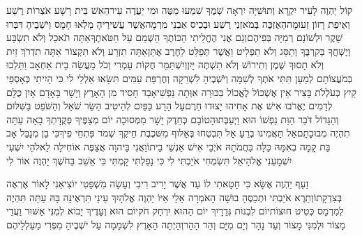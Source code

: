 \documentclass[../main/main.tex]{subfiles}
\begin{document}
\begin{multicols}{\ncols}
קוֹל יַהְוֶה לָעִיר יִקְרָא וְתוּשִׁיָּה יִרְאָה\SubEnd{} שְׁמֶךָ שִׁמְעוּ מַטֶּה וּמִי יַעֲדֶה עִיר\SubEnd{}\PreVerseSpace{}הַאִשׁ בֵּית רָשָׁע אֹצְרוֹת רֶשַׁע וְאֵיפַת רָזוֹן זְעוּמָה\PreVerseSpace{}הַאֶזְכֶּה בְּמֹאזְנֵי רֶשַׁע וּבְכִיס אַבְנֵי מִרְמָה\PreVerseSpace{}אֲשֶׁר עֲשִׁירֶיהָ מָלְאוּ חָמָס וְיֹשְׁבֶיהָ דִּבְּרוּ שָׁקֶר וּלְשׁוֹנָם רְמִיָּה בְּפִיהֶם\PreVerseSpace{}וְגַם אֲנִי הֶחֱלֵיתִי הַכּוֹתֶךָ הַשְׁמֵם עַל חַטֹּאתֶךָ\PreVerseSpace{}אַתָּה תֹאכַל וְלֹא תִשְׂבָּע וְיֶשְׁחֲךָ בְּקִרְבֶּךָ וְתַסֵּג וְלֹא תַפְלִיט וַאֲשֶׁר תְּפַלֵּט לַחֶרֶב אֶתֵּן\PreVerseSpace{}אַתָּה תִזְרַע וְלֹא תִקְצוֹר אַתָּה תִדְרֹךְ זַיִת וְלֹא תָסוּךְ שֶׁמֶן וְתִירוֹשׁ וְלֹא תִשְׁתֶּה יָּיִן\PreVerseSpace{}וְיִשְׁתַּמֵּר חֻקּוֹת עָמְרִי וְכֹל מַעֲשֵׂה בֵית אַחְאָב וַתֵּלְכוּ בְּמֹעֲצוֹתָם לְמַעַן תִּתִּי אֹתְךָ לְשַׁמָּה וְיֹשְׁבֶיהָ לִשְׁרֵקָה וְחֶרְפַּת עַמִּים\SubEnd{} תִּשָּׂאוּ \ClosedSection{}אַלְלַי לִי כִּי הָיִיתִי כְּאָסְפֵּי קַיִץ כְּעֹלְלֹת בָּצִיר אֵין אֶשְׁכּוֹל לֶאֱכוֹל בִּכּוּרָה אִוְּתָה נַפְשִׁי\PreVerseSpace{}אָבַד חָסִיד מִן הָאָרֶץ וְיָשָׁר בָּאָדָם אָיִן כֻּלָּם לְדָמִים יֶאֱרֹבוּ אִישׁ אֶת אָחִיהוּ יָצוּדוּ חֵרֶם\PreVerseSpace{}עַל הָרַע כַּפַּיִם לְהֵיטִיב הַשַּׂר שֹׁאֵל וְהַשֹּׁפֵט בַּשִּׁלּוּם וְהַגָּדוֹל דֹּבֵר הַוַּת נַפְשׁוֹ הוּא וַיְעַבְּתוּהָ\PreVerseSpace{}טוֹבָם כְּחֵדֶק יָשָׁר מִמְּסוּכָה יוֹם מְצַפֶּיךָ פְּקֻדָּתְךָ בָאָה עַתָּה תִהְיֶה מְבוּכָתָם\PreVerseSpace{}אַל תַּאֲמִינוּ בְרֵעַ אַל תִּבְטְחוּ בְּאַלּוּף מִשֹּׁכֶבֶת חֵיקֶךָ שְׁמֹר פִּתְחֵי פִיךָ\PreVerseSpace{}כִּי בֵן מְנַבֵּל אָב בַּת קָמָה בְאִמָּהּ כַּלָּה בַּחֲמֹתָהּ אֹיְבֵי אִישׁ אַנְשֵׁי בֵיתוֹ\PreVerseSpace{}וַאֲנִי בַּיהוָה אֲצַפֶּה אוֹחִילָה לֵאלֹהֵי יִשְׁעִי יִשְׁמָעֵנִי אֱלֹהָי\PreVerseSpace{}אַל תִּשְׂמְחִי אֹיַבְתִּי לִי כִּי נָפַלְתִּי קָמְתִּי כִּי אֵשֵׁב בַּחֹשֶׁךְ יַהְוֶה אוֹר לִי\OpenSection{}\par
{}זַעַף יַהְוֶה אֶשָּׂא כִּי חָטָאתִי לוֹ עַד אֲשֶׁר יָרִיב רִיבִי וְעָשָׂה מִשְׁפָּטִי יוֹצִיאֵנִי לָאוֹר אֶרְאֶה בְּצִדְקָתוֹ\PreVerseSpace{}וְתֵרֶא אֹיַבְתִּי וּתְכַסֶּהָ בוּשָׁה הָאֹמְרָה אֵלַי אַיּוֹ יַהְוֶה אֱלֹהָיִךְ עֵינַי תִּרְאֶינָּה בָּהּ עַתָּה תִּהְיֶה לְמִרְמָס כְּטִיט חוּצוֹת\PreVerseSpace{}יוֹם לִבְנוֹת גְּדֵרָיִךְ יוֹם הַהוּא יִרְחַק חֹק\PreVerseSpace{}יוֹם הוּא וְעָדֶיךָ יָבוֹא לְמִנִּי אַשּׁוּר וַעֲדֵי\SubEnd{} מָצוֹר וּלְמִנִּי מָצוֹר וְעַד נָהָר וְיָם מִיָּם וְהַר הָהָר\PreVerseSpace{}וְהָיְתָה הָאָרֶץ לִשְׁמָמָה עַל יֹשְׁבֶיהָ מִפְּרִי מַעַלְלֵיהֶם\OpenSection{}\par

\end{multicols}
\end{document}
